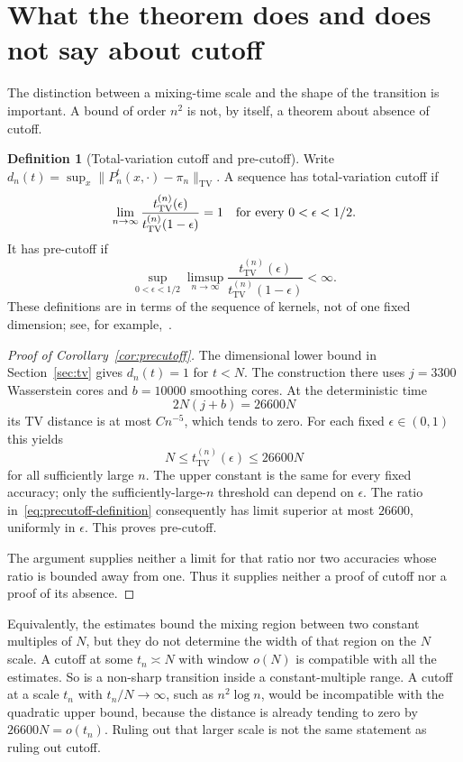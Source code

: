 \documentclass[11pt]{article}
\theoremstyle{definition}\newtheorem{definition}[theorem]{Definition}
\theoremstyle{remark}\newtheorem{remark}[theorem]{Remark}
\newcommand{\TV}{\mathrm{TV}}
\begin{document}
\section{What the theorem does and does not say about cutoff}\label{sec:cutoff}
The distinction between a mixing-time scale and the shape of the transition is important. A bound of order $n^2$ is not, by itself, a theorem about absence of cutoff.

\begin{definition}[Total-variation cutoff and pre-cutoff]
Write $d_n(t)=\sup_x\|P_n^t(x,\cdot)-\pi_n\|_{\TV}$. A sequence has total-variation cutoff if
\begin{equation}\label{eq:cutoff-definition}
 \lim_{n\to\infty}\frac{t_{\TV}^{(n)}(\epsilon)}
 {t_{\TV}^{(n)}(1-\epsilon)}=1
 \quad\hbox{for every }0<\epsilon<1/2.
\end{equation}
It has pre-cutoff if
\begin{equation}\label{eq:precutoff-definition}
 \sup_{0<\epsilon<1/2}\limsup_{n\to\infty}
 \frac{t_{\TV}^{(n)}(\epsilon)}{t_{\TV}^{(n)}(1-\epsilon)}<\infty.
\end{equation}
These definitions are in terms of the sequence of kernels, not of one fixed dimension; see, for example,~\cite{HermonPeres}.
\end{definition}

\begin{proof}[Proof of Corollary~\ref{cor:precutoff}]
The dimensional lower bound in Section~\ref{sec:tv} gives $d_n(t)=1$ for $t<N$. The construction there uses $j=3300$ Wasserstein cores and $b=10000$ smoothing cores. At the deterministic time
\[
 2N(j+b)=26600N
\]
its TV distance is at most $Cn^{-5}$, which tends to zero. For each fixed $\epsilon\in(0,1)$ this yields
\[
 N\le t_{\TV}^{(n)}(\epsilon)\le26600N
\]
for all sufficiently large $n$. The upper constant is the same for every fixed accuracy; only the sufficiently-large-$n$ threshold can depend on $\epsilon$. The ratio in~\eqref{eq:precutoff-definition} consequently has limit superior at most $26600$, uniformly in $\epsilon$. This proves pre-cutoff.

The argument supplies neither a limit for that ratio nor two accuracies whose ratio is bounded away from one. Thus it supplies neither a proof of cutoff nor a proof of its absence.
\end{proof}

Equivalently, the estimates bound the mixing region between two constant multiples of $N$, but they do not determine the width of that region on the $N$ scale. A cutoff at some $t_n\asymp N$ with window $o(N)$ is compatible with all the estimates. So is a non-sharp transition inside a constant-multiple range. A cutoff at a scale $t_n$ with $t_n/N\to\infty$, such as $n^2\log n$, would be incompatible with the quadratic upper bound, because the distance is already tending to zero by $26600N=o(t_n)$. Ruling out that larger scale is not the same statement as ruling out cutoff.
\end{document}
